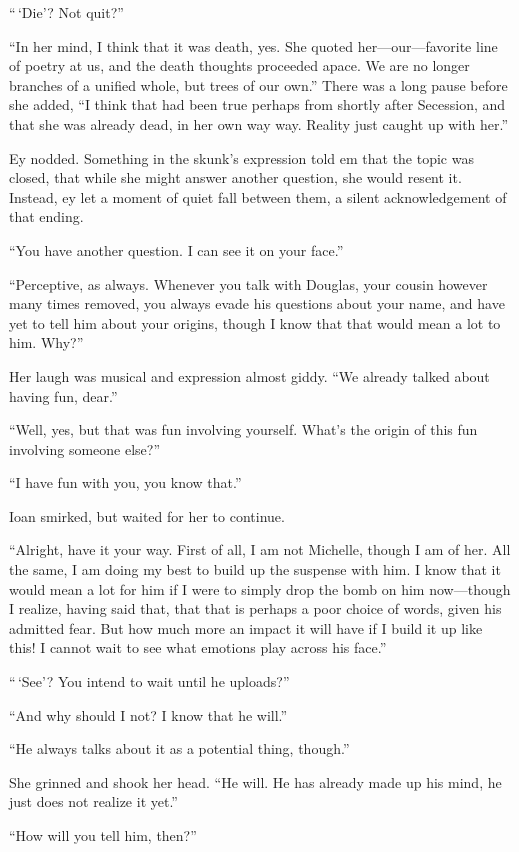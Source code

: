 ``\,`Die'? Not quit?''

``In her mind, I think that it was death, yes. She quoted her---our---favorite line of poetry at us, and the death thoughts proceeded apace. We are no longer branches of a unified whole, but trees of our own.'' There was a long pause before she added, ``I think that had been true perhaps from shortly after Secession, and that she was already dead, in her own way way. Reality just caught up with her.''

Ey nodded. Something in the skunk's expression told em that the topic was closed, that while she might answer another question, she would resent it. Instead, ey let a moment of quiet fall between them, a silent acknowledgement of that ending.

``You have another question. I can see it on your face.''

``Perceptive, as always. Whenever you talk with Douglas, your cousin however many times removed, you always evade his questions about your name, and have yet to tell him about your origins, though I know that that would mean a lot to him. Why?''

Her laugh was musical and expression almost giddy. ``We already talked about having fun, dear.''

``Well, yes, but that was fun involving yourself. What's the origin of this fun involving someone else?''

``I have fun with you, you know that.''

Ioan smirked, but waited for her to continue.

``Alright, have it your way. First of all, I am not Michelle, though I am of her. All the same, I am doing my best to build up the suspense with him. I know that it would mean a lot for him if I were to simply drop the bomb on him now---though I realize, having said that, that that is perhaps a poor choice of words, given his admitted fear. But how much more an impact it will have if I build it up like this! I cannot wait to see what emotions play across his face.''

``\,`See'? You intend to wait until he uploads?''

``And why should I not? I know that he will.''

``He always talks about it as a potential thing, though.''

She grinned and shook her head. ``He will. He has already made up his mind, he just does not realize it yet.''

``How will you tell him, then?''

